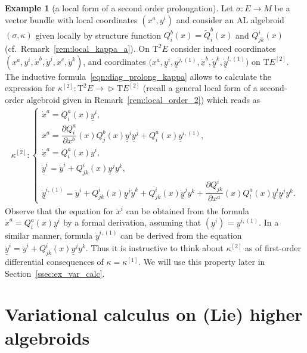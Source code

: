 \documentclass[10pt,a4paper]{amsart}
\newcommand{\wt}[1]{\widetilde{#1}} %
\newcommand{\und}{\underline}
\newcommand{\pa}{\partial}
\newcommand{\ra}{\rightarrow}
\newcommand{\E}[1]{E^{[#1]}} %
\newcommand{\T}{\mathrm{T}} %
\newcommand{\TT}[1]{\mathrm{T}^{#1}} %
\def\relto{\rightarrow\!\!\vartriangleright} %
\numberwithin{equation}{section}
\theoremstyle{definition}
\newtheorem{ex}[thm]{Example}
\begin{document}
\begin{ex}[a local form of a second order prolongation] \label{ex:prolong_2}
Let $\sigma\colon E\ra M$ be a vector bundle with local coordinates $(x^a,y^i)$ and consider an AL algebroid $(\sigma,\kappa)$ given locally by structure function $Q^b_i(x)=\wt Q^b_i(x)$ and $Q^i_{jk}(x)$ (cf.\ Remark~\ref{rem:local_kappa_a}). On $\TT 2 E$ consider induced coordinates $(x^a,y^i,\dot x^b,\dot y^j,\ddot x^c,\ddot y^k)$, and coordinates $\big(x^a,\und{y}^i,\und{y}^{j,(1)},\dot{\und{x}}^b,\dot{\und{y}}^k,\dot{\und{y}}^{l,(1)}\big)$ on $\T \E 2$. The inductive formula~\eqref{eqn:diag_prolong_kappa} allows to calculate the expression for $\kappa^{[2]}\colon \TT 2 E\relto \T \E 2$ (recall a general local form of a second-order algebroid given in Remark~\ref{rem:local_order_2}) which reads as
\begin{gather}\label{eqn:kappa_prolong_2}
\kappa^{[2]}\colon
\begin{cases}
\dot{x}^a = Q^a_i(x) \und{y}^i, \\
\ddot{x}^a = \dfrac{\pa Q^a_i}{\pa x^b}(x)Q^b_j(x)\und{y}^i\und{y}^j + Q^a_i(x) \und{y}^{i,(1)}, \\
\dot{\und{x}}^a = Q^{a}_i(x)y^i,\\
\dot{\und{y}}^i = \dot{y}^i + Q^i_{jk}(x) \und{y}^j y^k,\\
\dot{\und{y}}^{i,(1)} = \ddot{y}^i + Q^i_{jk}(x)\und{y}^j \dot{y}^k +Q^i_{jk}(x)\dot{\und{y}}^j {y}^k+ \dfrac{\pa Q^i_{jk}}{\pa x^a}(x)Q^a_l(x)\und{y}^l\und{y}^j {y}^k .
\end{cases}
\end{gather}
Observe that the equation for $\ddot{x}^i$ can be obtained from the formula $\dot{x}^a = Q^a_i(x) \und{y}^i$ by a formal derivation, assuming that $(\und{y}^i)^{\dot{}}=\und{y}^{i,(1)}$. In a similar manner, formula $\dot{\und{y}}^{i,(1)}$ can be derived from the equation $\dot{\und{y}}^i = \dot{y}^i + Q^i_{jk}(x) \und{y}^j y^k$. Thus it is instructive to think about $\kappa^{[2]}$ as of first-order differential consequences of $\kappa=\kappa^{[1]}$. We will use this property later in Section~\ref{ssec:ex_var_calc}.
\end{ex}

\section{Variational calculus on (Lie) higher algebroids}\label{sec:var_calc}
\end{document}
